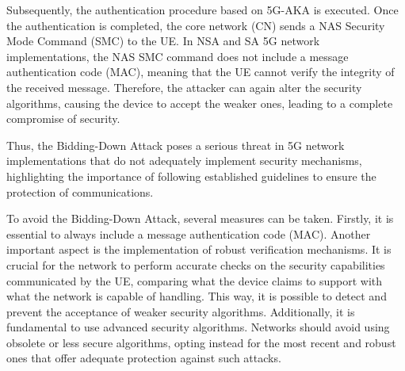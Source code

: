 \documentclass[english]{article}
\begin{document}
Subsequently, the authentication procedure based on 5G-AKA is executed. Once
the authentication is completed, the core network (CN) sends a NAS Security
Mode Command (SMC) to the UE. In NSA and SA 5G network implementations, the NAS
SMC command does not include a message authentication code (MAC), meaning that
the UE cannot verify the integrity of the received message. Therefore, the
attacker can again alter the security algorithms, causing the device to accept
the weaker ones, leading to a complete compromise of security.

Thus, the Bidding-Down Attack poses a serious threat in 5G network
implementations that do not adequately implement security mechanisms,
highlighting the importance of following established guidelines to ensure the
protection of communications.

To avoid the Bidding-Down Attack, several measures can be taken. Firstly, it is
essential to always include a message authentication code (MAC). Another
important aspect is the implementation of robust verification mechanisms. It is
crucial for the network to perform accurate checks on the security capabilities
communicated by the UE, comparing what the device claims to support with what
the network is capable of handling. This way, it is possible to detect and
prevent the acceptance of weaker security algorithms. Additionally, it is
fundamental to use advanced security algorithms. Networks should avoid using
obsolete or less secure algorithms, opting instead for the most recent and
robust ones that offer adequate protection against such attacks.

\end{document}
